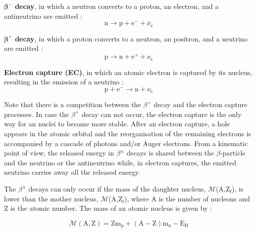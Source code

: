 \documentclass[main.tex]{subfiles}
\begin{document}
\bigskip


\NI $\boldsymbol{\beta^-}$ \textbf{decay}, in which a neutron converts to a proton, an electron, and a antineutrino are emitted :
\begin{equation}
\text{n} \rightarrow \text{p} + \text{e}^- + \bar{\nu}_\text{e}
\end{equation}


\bigskip


\NI $\boldsymbol{\beta^+}$ \textbf{decay}, in which a proton converts to a neutron, an positron, and a neutrino are emitted :
\begin{equation}
\text{p} \rightarrow \text{n} + \text{e}^+ + \nu_\text{e}
\end{equation} 


\bigskip 

 
\NI \textbf{Electron capture (EC)}, in which an atomic electron is captured by its nucleus, resulting in the emission of a neutrino :
\begin{equation}
\text{p} + \text{e}^- \rightarrow \text{n} + \nu_{\text{e}}
\end{equation} 


\bigskip
 

\NI Note that there is a competition between the $\beta^+$ decay and the electron capture processes. In case the $\beta^+$ decay can not occur, the electron capture is the only way for an nuclei to become more stable. After an electron capture, a hole appears in the atomic orbital and the reorganisation of the remaining electrons is accompanied by a cascade of photons and/or Auger electrons. From a kinematic point of view, the released energy in $\beta^{\pm}$ decays is shared between the $\beta$-particle and the neutrino or the antineutrino while, in electron captures, the emitted neutrino carries away all the released energy. 


\bigskip


\NI The $\beta^{\pm}$ decays can only occur if the mass of the daughter nucleus, $\mathcal{M}$(A,Z$_\text{f}$), is lower than the mother nucleus, $\mathcal{M}$(A,Z$_\text{i}$), where A is the number of nucleons and Z is the atomic number. The mass of an atomic nucleus is given by : 


\begin{equation}\label{eq:Mass}
\mathcal{M} (\text{A},\text{Z}) = \text{Z} \text{m}_\text{p} + (\text{A}-\text{Z}) \text{m}_\text{n} - \text{E}_\text{B}
\end{equation}


\bigskip
\end{document}
